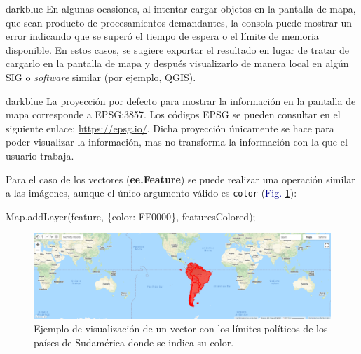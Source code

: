 \documentclass[
  12pt,
  letterpaper,
  twoside]{book}
\newenvironment{Shaded}{\begin{snugshade}}{\end{snugshade}}
\newcommand{\BuiltInTok}[1]{#1}
\newcommand{\DataTypeTok}[1]{\textcolor[rgb]{0.00,0.00,0.00}{#1}}
\newcommand{\FunctionTok}[1]{\textcolor[rgb]{0.48,0.12,0.64}{#1}}
\newcommand{\NormalTok}[1]{#1}
\newcommand{\OperatorTok}[1]{\textcolor[rgb]{0.00,0.00,0.00}{#1}}
\newcommand{\StringTok}[1]{\textcolor[rgb]{0.87,0.29,0.22}{#1}}
\newcommand\boldpurple[1]{\textcolor{darkpurple}{\textbf{#1}}}
\begin{document}
\begin{bluebox2}

\begin{awesomeblock}{5pt}{\faLightbulb}{darkblue}
En algunas ocasiones, al intentar cargar objetos en la pantalla de mapa, que sean producto de procesamientos demandantes, la consola puede mostrar un error indicando que se superó el tiempo de espera o el límite de memoria disponible. En estos casos, se sugiere exportar el resultado en lugar de tratar de cargarlo en la pantalla de mapa y después visualizarlo de manera local en algún SIG o \emph{software} similar (por ejemplo, QGIS).

\end{awesomeblock}

\end{bluebox2}

\begin{bluebox2}

\begin{awesomeblock}{5pt}{\faLightbulb}{darkblue}
La proyección por defecto para mostrar la información en la pantalla de mapa corresponde a EPSG:3857. Los códigos EPSG se pueden consultar en el siguiente enlace: \url{https://epsg.io/}. Dicha proyección únicamente se hace para poder visualizar la información, mas no transforma la información con la que el usuario trabaja.

\end{awesomeblock}

\end{bluebox2}

Para el caso de los vectores (\boldpurple{ee.Feature}) se puede realizar una operación similar a las imágenes, aunque el único argumento válido es \texttt{color} (\textcolor{darkblue}{Fig.} \ref{fig:f33}):

\begin{Shaded}
\begin{Highlighting}[]
\BuiltInTok{Map}\OperatorTok{.}\FunctionTok{addLayer}\NormalTok{(feature}\OperatorTok{,}\NormalTok{ \{}\DataTypeTok{color}\OperatorTok{:} \StringTok{\textquotesingle{}FF0000\textquotesingle{}}\NormalTok{\}}\OperatorTok{,} \StringTok{\textquotesingle{}featuresColored\textquotesingle{}}\NormalTok{)}\OperatorTok{;}
\end{Highlighting}
\end{Shaded}

\begin{figure}[H]

{\centering \includegraphics[width=0.95\linewidth]{Img/SAmerica} 

}

\caption{Ejemplo de visualización de un vector con los límites políticos de los países de Sudamérica donde se indica su color.}\label{fig:f33}
\end{figure}
\end{document}
